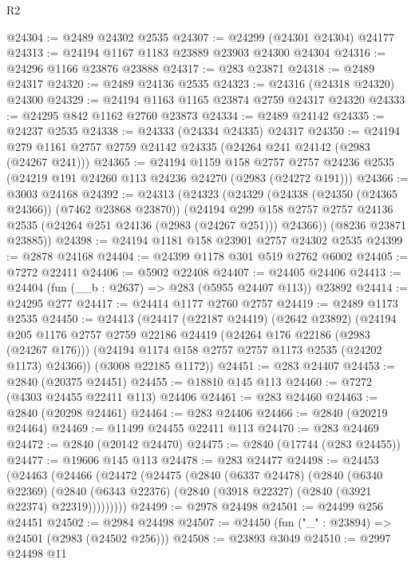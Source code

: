 \begin{lexlean}{R2}
\begin{coremodule}
@24304 := @2489 @24302 @2535
@24307 := @24299 (@24301 @24304) @24177
@24313 := @24194 @1167 @1183 @23889 @23903 @24300 @24304
@24316 := @24296 @1166 @23876 @23888
@24317 := @283 @23871
@24318 := @2489 @24317
@24320 := @2489 @24136 @2535
@24323 := @24316 (@24318 @24320) @24300
@24329 := @24194 @1163 @1165 @23874 @2759 @24317 @24320
@24333 := @24295 @842 @1162 @2760 @23873
@24334 := @2489 @24142
@24335 := @24237 @2535
@24338 := @24333 (@24334 @24335) @24317
@24350 := @24194 @279 @1161 @2757 @2759 @24142 @24335 (@24264 @241 @24142 (@2983 (@24267 @241)))
@24365 := @24194
    @1159
    @158
    @2757
    @2757
    @24236
    @2535
    (@24219 @191 @24260 @113 @24236 @24270 (@2983 (@24272 @191)))
@24366 := @3003 @24168
@24392 := @24313
    (@24323
      (@24329
        (@24338 (@24350 (@24365 @24366)) (@7462 @23868 @23870))
        (@24194
          @299
          @158
          @2757
          @2757
          @24136
          @2535
          (@24264 @251 @24136 (@2983 (@24267 @251)))
          @24366))
      (@8236 @23871 @23885))
@24398 := @24194 @1181 @158 @23901 @2757 @24302 @2535
@24399 := @2878 @24168
@24404 := @24399 @1178 @301 @519 @2762 @6002
@24405 := @7272 @22411
@24406 := @5902 @22408
@24407 := @24405 @24406
@24413 := @24404 (fun (__b : @2637) => @283 (@5955 @24407 @113)) @23892
@24414 := @24295 @277
@24417 := @24414 @1177 @2760 @2757
@24419 := @2489 @1173 @2535
@24450 := @24413
    (@24417
      (@22187 @24419)
      (@2642 @23892)
      (@24194
        @205
        @1176
        @2757
        @2759
        @22186
        @24419
        (@24264 @176 @22186 (@2983 (@24267 @176)))
        (@24194 @1174 @158 @2757 @2757 @1173 @2535 (@24202 @1173) @24366))
      (@3008 @22185 @1172))
@24451 := @283 @24407
@24453 := @2840 (@20375 @24451)
@24455 := @18810 @145 @113
@24460 := @7272 (@4303 @24455 @22411 @113) @24406
@24461 := @283 @24460
@24463 := @2840 (@20298 @24461)
@24464 := @283 @24406
@24466 := @2840 (@20219 @24464)
@24469 := @11499 @24455 @22411 @113
@24470 := @283 @24469
@24472 := @2840 (@20142 @24470)
@24475 := @2840 (@17744 (@283 @24455))
@24477 := @19606 @145 @113
@24478 := @283 @24477
@24498 := @24453
    (@24463
      (@24466
        (@24472
          (@24475
            (@2840
              (@6337 @24478)
              (@2840
                (@6340 @22369)
                (@2840 (@6343 @22376) (@2840 (@3918 @22327) (@2840 (@3921 @22374) @22319)))))))))
@24499 := @2978 @24498
@24501 := @24499 @256 @24451
@24502 := @2984 @24498
@24507 := @24450 (fun ("_" : @23894) => @24501 (@2983 (@24502 @256)))
@24508 := @23893 @3049
@24510 := @2997 @24498 @11

\end{coremodule}
\end{lexlean}
